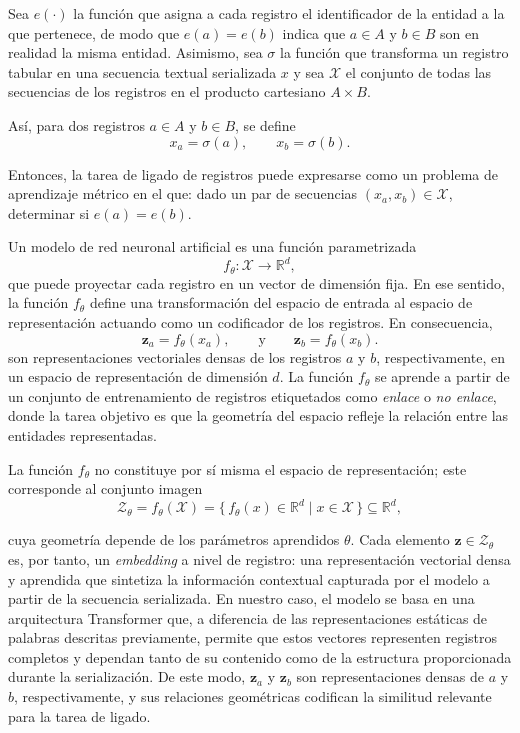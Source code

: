 Sea $e(\cdot)$ la función que asigna a cada registro el identificador de la entidad a la que pertenece, de modo que $e(a)=e(b)$ indica que $a\in A$ y $b\in B$ son en realidad la misma entidad. Asimismo, sea $\sigma$ la función que transforma un registro tabular en una secuencia textual serializada $x$ y sea $\mathcal{X}$ el conjunto de todas las secuencias de los registros en el producto cartesiano $A \times B$.

Así, para dos registros $a\in A$ y $b\in B$, se define
\[
x_a=\sigma(a),
\qquad
x_b=\sigma(b).
\]

Entonces, la tarea de ligado de registros puede expresarse como un problema de aprendizaje métrico en el que: dado un par de secuencias $(x_a,x_b) \in \mathcal{X}$, determinar si $e(a)=e(b)$.


Un modelo de red neuronal artificial es una función parametrizada
\[
f_\theta:\mathcal{X}\longrightarrow\mathbb{R}^{d},
\]
que puede proyectar cada registro en un vector de dimensión fija. En ese sentido, la función $f_\theta$ define una transformación del espacio de entrada al espacio de representación actuando como un codificador de los registros. En consecuencia,
\[
\mathbf{z}_a=f_\theta(x_a),
\qquad \text{y} \qquad
\mathbf{z}_b=f_\theta(x_b).
\]
son representaciones vectoriales densas de los registros $a$ y $b$, respectivamente, en un espacio de representación de dimensión $d$. La función $f_\theta$ se aprende a partir de un conjunto de entrenamiento de registros etiquetados como \textit{enlace} o \textit{no enlace}, donde la tarea objetivo es que la geometría del espacio refleje la relación entre las entidades representadas.

La función $f_\theta$ no constituye por sí misma el espacio de representación; este corresponde al conjunto imagen
\[
\mathcal{Z}_\theta
=f_\theta(\mathcal{X})
=\bigl\{\,f_\theta(x)\in\mathbb{R}^{d} \;\big|\; x\in\mathcal{X}\,\bigr\}
\subseteq\mathbb{R}^{d},
\]

cuya geometría depende de los parámetros aprendidos $\theta$. Cada elemento $\mathbf{z}\in\mathcal{Z}_\theta$ es, por tanto, un \textit{embedding} a nivel de registro: una representación vectorial densa y aprendida que sintetiza la información contextual capturada por el modelo a partir de la secuencia serializada. En nuestro caso, el modelo se basa en una arquitectura Transformer que, a diferencia de las representaciones estáticas de palabras descritas previamente, permite que estos vectores representen registros completos y dependan tanto de su contenido como de la estructura proporcionada durante la serialización. De este modo, $\mathbf{z}_a$ y $\mathbf{z}_b$ son representaciones densas de $a$ y $b$, respectivamente, y sus relaciones geométricas codifican la similitud relevante para la tarea de ligado.

